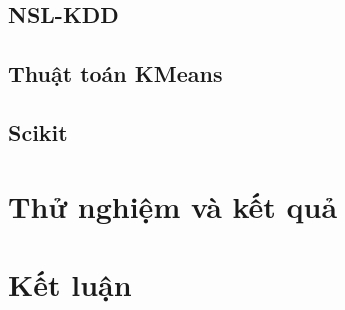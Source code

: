 \documentclass{article}
\begin{document}
\begin{flushleft}
        \subsection{NSL-KDD}
        
        \subsection{Thuật toán KMeans}
        
        \subsection{Scikit}
        
        \newpage
        \section{Thử nghiệm và kết quả}
        
        \newpage
        \section{Kết luận}
        
    \end{flushleft}
    \newpage
     
    
\end{document}
